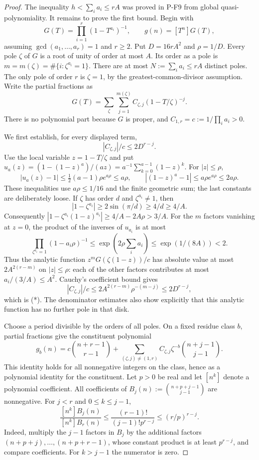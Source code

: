 \begin{proof}
The inequality $h<\sum_i a_i\le rA$ was proved in P-F9 from global
quasi-polynomiality. It remains to prove the first bound. Begin with
\[
 G(T)=\prod_{i=1}^r(1-T^{a_i})^{-1},\qquad g(n)=[T^n]G(T),
\]
assuming $\gcd(a_1,\ldots,a_r)=1$ and $r\ge2$. Put
$D=16rA^2$ and $\rho=1/D$. Every pole $\zeta$ of $G$ is a root of unity
of order at most $A$. Its order as a pole is
$m=m(\zeta)=\#\{i:\zeta^{a_i}=1\}$.
There are at most $N:=\sum_i a_i\le rA$ distinct poles. The only pole
of order $r$ is $\zeta=1$, by the greatest-common-divisor assumption.
Write the partial fractions as
\[
 G(T)=\sum_{\zeta}\sum_{j=1}^{m(\zeta)}
 C_{\zeta,j}(1-T/\zeta)^{-j}.
\]
There is no polynomial part because $G$ is proper, and
$C_{1,r}=c:=1/\prod_i a_i>0$.

We first establish, for every displayed term,
\[
 |C_{\zeta,j}|/c\le 2D^{r-j}.                 \tag{*}
\]
Use the local variable $z=1-T/\zeta$ and put
$u_a(z)=(1-(1-z)^a)/(az)=a^{-1}\sum_{k=0}^{a-1}(1-z)^k$.
For $|z|\le\rho$,
\[
 |u_a(z)-1|\le\tfrac12(a-1)\rho e^{a\rho}\le a\rho,
 \qquad
 |(1-z)^a-1|\le a\rho e^{a\rho}\le2a\rho.
\]
These inequalities use $a\rho\le1/16$ and the finite geometric sum;
the last constants are deliberately loose. If $\zeta$ has order $d$
and $\zeta^{a_i}\ne1$, then
\[
 |1-\zeta^{a_i}|\ge2\sin(\pi/d)\ge4/d\ge4/A.
\]
Consequently
$|1-\zeta^{a_i}(1-z)^{a_i}|\ge4/A-2A\rho>3/A$.
For the $m$ factors vanishing at $z=0$, the product of the inverses of
$u_{a_i}$ is at most
\[
 \prod_{\zeta^{a_i}=1}(1-a_i\rho)^{-1}
 \le\exp(2\rho\textstyle\sum_i a_i)
 \le\exp(1/(8A))<2.
\]
Thus the analytic function $z^mG(\zeta(1-z))/c$ has absolute value at
most $2A^{2(r-m)}$ on $|z|\le\rho$: each of the other factors contributes
at most $a_i/(3/A)\le A^2$.
Cauchy's coefficient bound gives
\[
 |C_{\zeta,j}|/c
 \le2A^{2(r-m)}\rho^{-(m-j)}
 \le2D^{r-j},
\]
which is (*). The denominator estimates also show explicitly that this
analytic function has no further pole in that disk.

Choose a period divisible by the orders of all poles. On a fixed residue
class $b$, partial fractions give the constituent polynomial
\[
 g_b(n)=c\binom{n+r-1}{r-1}
 +\sum_{(\zeta,j)\ne(1,r)}
     C_{\zeta,j}\zeta^{-b}\binom{n+j-1}{j-1}.
\]
This identity holds for all nonnegative integers on the class, hence as
a polynomial identity for the constituent. Let $p>0$ be real and let
$[n^k]$ denote a polynomial coefficient. All coefficients of
$B_j(n):=\binom{n+p+j-1}{j-1}$ are nonnegative. For $j<r$ and
$0\le k\le j-1$,
\[
 \frac{[n^k]B_j(n)}{[n^k]B_r(n)}
 \le \frac{(r-1)!}{(j-1)!p^{r-j}}
 \le (r/p)^{r-j}.                              \tag{**}
\]
Indeed, multiply the $j-1$ factors in $B_j$ by the additional factors
$(n+p+j),\ldots,(n+p+r-1)$, whose constant product is at least
$p^{r-j}$, and compare coefficients. For $k>j-1$ the numerator is zero.


\end{proof}

